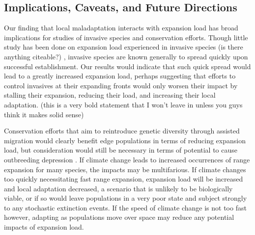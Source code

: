 





\subsection*{Implications, Caveats, and Future Directions}%

Our finding that local maladaptation interacts with expansion load has broad implications for studies of invasive species and conservation efforts. Though little study has been done on expansion load experienced in invasive species \color{red}(is there anything citeable?) \color{black}, invasive species are known generally to spread quickly upon successful establishment. Our results would indicate that such quick spread would lead to a greatly increased expansion load, perhaps suggesting that efforts to control invasives at their expanding fronts would only worsen their impact by stalling their expansion, reducing their load, and increasing their local adaptation. \color{red} (this is a very bold statement that I won't leave in unless you guys think it makes solid sense) \color{black} 

Conservation efforts that aim to reintroduce genetic diversity through assisted migration would clearly benefit edge populations in terms of reducing expansion load, but consideration would still be necessary in terms of potential to cause outbreeding depression \citep{Aitken:2013}. If climate change leads to increased occurrences of range expansion for many species, the impacts may be multifarious. If climate changes too quickly necessitating fast range expansion, expansion load will be increased and local adaptation decreased, a scenario that is unlikely to be biologically viable, or if so would leave populations in a very poor state and subject strongly to any stochastic extinction events. If the speed of climate change is not too fast however, adapting as populations move over space may reduce any potential impacts of expansion load.

